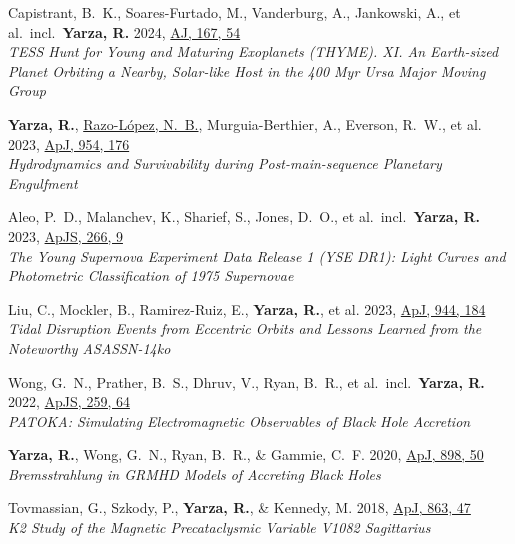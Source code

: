 \item Capistrant, B.~K., Soares-Furtado, M., Vanderburg, A., Jankowski, A., et al.\ incl.\ \textbf{Yarza, R.} 2024, \href{https://ui.adsabs.harvard.edu/abs/2024AJ....167...54C}{AJ, 167, 54}\\\textit{TESS Hunt for Young and Maturing Exoplanets (THYME). XI\@. An Earth-sized Planet Orbiting a Nearby, Solar-like Host in the 400 Myr Ursa Major Moving Group}

\item \textbf{Yarza, R.}, \underline{Razo-López, N.~B.}, Murguia-Berthier, A., Everson, R.~W., et al. 2023, \href{https://ui.adsabs.harvard.edu/abs/2023ApJ...954..176Y}{ApJ, 954, 176}\\\textit{Hydrodynamics and Survivability during Post-main-sequence Planetary Engulfment}

\item Aleo, P.~D., Malanchev, K., Sharief, S., Jones, D.~O., et al.\ incl.\ \textbf{Yarza, R.} 2023, \href{https://ui.adsabs.harvard.edu/abs/2023ApJS..266....9A}{ApJS, 266, 9}\\\textit{The Young Supernova Experiment Data Release 1 (YSE DR1): Light Curves and Photometric Classification of 1975 Supernovae}

\item Liu, C., Mockler, B., Ramirez-Ruiz, E., \textbf{Yarza, R.}, et al. 2023, \href{https://ui.adsabs.harvard.edu/abs/2023ApJ...944..184L}{ApJ, 944, 184}\\\textit{Tidal Disruption Events from Eccentric Orbits and Lessons Learned from the Noteworthy ASASSN-14ko}

\item Wong, G.~N., Prather, B.~S., Dhruv, V., Ryan, B.~R., et al.\ incl.\ \textbf{Yarza, R.} 2022, \href{https://ui.adsabs.harvard.edu/abs/2022ApJS..259...64W}{ApJS, 259, 64}\\\textit{PATOKA\@: Simulating Electromagnetic Observables of Black Hole Accretion}

\item \textbf{Yarza, R.}, Wong, G.~N., Ryan, B.~R., \& Gammie, C.~F. 2020, \href{https://ui.adsabs.harvard.edu/abs/2020ApJ...898...50Y}{ApJ, 898, 50}\\\textit{Bremsstrahlung in GRMHD Models of Accreting Black Holes}

\item Tovmassian, G., Szkody, P., \textbf{Yarza, R.}, \& Kennedy, M. 2018, \href{https://ui.adsabs.harvard.edu/abs/2018ApJ...863...47T}{ApJ, 863, 47}\\\textit{K2 Study of the Magnetic Precataclysmic Variable V1082 Sagittarius}

